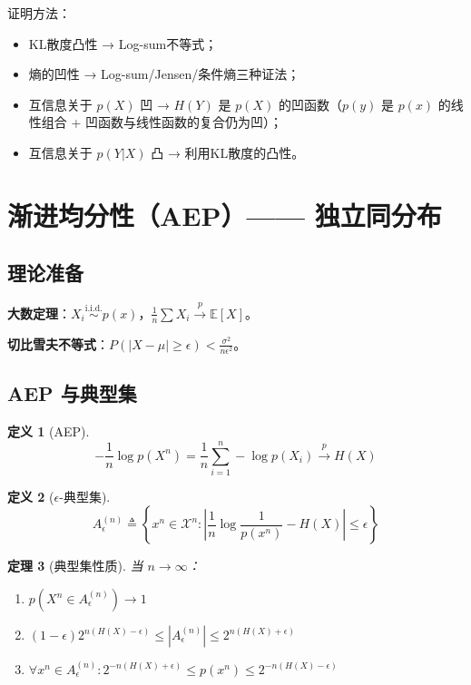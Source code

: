 \documentclass[12pt,a4paper]{ctexart}
\newtheorem{theorem}{定理}[section]
\theoremstyle{definition}
\newtheorem{definition}[theorem]{定义}
\newcommand{\EE}{\mathbb{E}}
\newcommand{\XX}{\mathcal{X}}
\newcommand{\iid}{\overset{\text{i.i.d.}}{\sim}}
\begin{document}
证明方法：
\begin{itemize}[nosep]
  \item KL散度凸性 → Log-sum不等式；
  \item 熵的凹性 → Log-sum/Jensen/条件熵三种证法；
  \item 互信息关于 $p(X)$ 凹 → $H(Y)$ 是 $p(X)$ 的凹函数（$p(y)$ 是 $p(x)$ 的线性组合 + 凹函数与线性函数的复合仍为凹）；
  \item 互信息关于 $p(Y|X)$ 凸 → 利用KL散度的凸性。
\end{itemize}

\section{渐进均分性（AEP）—— 独立同分布}

\subsection{理论准备}

\noindent\textbf{大数定理}：$X_i \iid p(x)$，$\frac{1}{n}\sum X_i \xrightarrow{p} \EE[X]$。

\noindent\textbf{切比雪夫不等式}：$P(|X-\mu| \geq \epsilon) < \frac{\sigma^2}{n\epsilon^2}$。

\subsection{AEP 与典型集}

\begin{definition}[AEP]
\[
-\frac{1}{n}\log p(X^n) = \frac{1}{n}\sum_{i=1}^{n} -\log p(X_i) \xrightarrow{p} H(X)
\]
\end{definition}

\begin{definition}[$\epsilon$-典型集]
\[
A_\epsilon^{(n)} \triangleq \left\{x^n \in \XX^n: \left|\frac{1}{n}\log\frac{1}{p(x^n)} - H(X)\right| \leq \epsilon\right\}
\]
\end{definition}

\begin{theorem}[典型集性质]
当 $n \to \infty$：
\begin{enumerate}[label=(\arabic*),nosep]
  \item $p(X^n \in A_\epsilon^{(n)}) \to 1$
  \item $(1-\epsilon)2^{n(H(X)-\epsilon)} \leq |A_\epsilon^{(n)}| \leq 2^{n(H(X)+\epsilon)}$
  \item $\forall x^n \in A_\epsilon^{(n)}: 2^{-n(H(X)+\epsilon)} \leq p(x^n) \leq 2^{-n(H(X)-\epsilon)}$
\end{enumerate}
\end{theorem}
\end{document}
